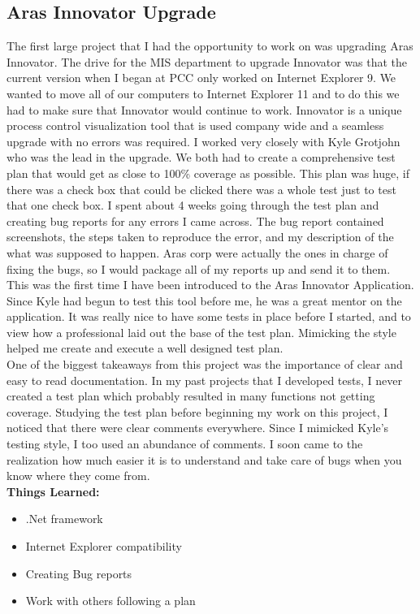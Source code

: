 \documentclass[letterpaper,10pt,notitlepage,fleqn]{article}
\begin{document}
\subsection{Aras Innovator Upgrade}
\indent The first large project that I had the opportunity to work on was upgrading 
Aras Innovator. The drive for the MIS department to upgrade Innovator was that the 
current version when I began at PCC only worked on Internet Explorer 9. We wanted 
to move all of our computers to Internet Explorer 11 and to do this we had to make 
sure that Innovator would continue to work. Innovator is a unique process control 
visualization tool that is used company wide and a seamless upgrade with no errors
was required. I worked very closely with Kyle Grotjohn who was the lead in the 
upgrade. We both had to create a comprehensive test plan that would get as close 
to 100\% coverage as possible. This plan was huge, if there was a check box that 
could be clicked there was a whole test just to test that one check box. I spent 
about 4 weeks going through the test plan and creating bug reports for any errors 
I came across. The bug report contained screenshots, the steps taken to reproduce 
the error, and my description of the what was supposed to happen. Aras corp were 
actually the ones in charge of fixing the bugs, so I would package all of my 
reports up and send it to them. 
\\
\indent This was the first time I have been introduced to the Aras Innovator Application. 
Since Kyle had begun to test this tool before me, he was a great mentor on the application. 
It was really nice to have some tests in place before I started, and to view how a professional
laid out the base of the test plan. Mimicking the style helped me create and execute 
a well designed test plan.
\\
\indent One of the biggest takeaways from this project was the importance of clear 
and easy to read documentation. In my past projects that I developed tests, I 
never created a test plan which probably resulted in many functions not getting coverage.
Studying the test plan before beginning my work on this project, I noticed that 
there were clear comments everywhere. Since I mimicked Kyle's testing style, I too 
used an abundance of comments. I soon came to the realization how much easier 
it is to understand and take care of bugs when you know where they come from. \\


\textbf{Things Learned:}
\begin{itemize} 
        \item .Net framework
        \item Internet Explorer compatibility
        \item Creating Bug reports
        \item Work with others following a plan
    \end{itemize}
\end{document}
